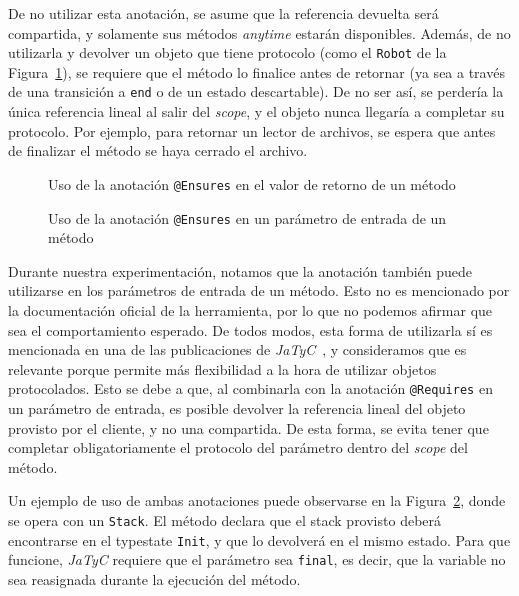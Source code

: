 De no utilizar esta anotación, se asume que la referencia devuelta será compartida, y solamente sus métodos \textit{anytime} estarán disponibles. Además, de no utilizarla y devolver un objeto que tiene protocolo (como el \texttt{Robot} de la Figura~\ref{jatyc:ensures}), se requiere que el método lo finalice antes de retornar (ya sea a través de una transición a \texttt{end} o de un estado descartable). De no ser así, se perdería la única referencia lineal al salir del \textit{scope}, y el objeto nunca llegaría a completar su protocolo. Por ejemplo, para retornar un lector de archivos, se espera que antes de finalizar el método se haya cerrado el archivo.

\begin{figure}[htbp]
    \centering
    
    \caption{Uso de la anotación \texttt{@Ensures} en el valor de retorno de un método}
    \label{jatyc:ensures}
\end{figure}

\begin{figure}[htbp]
    \centering
    
    \caption{Uso de la anotación \texttt{@Ensures} en un parámetro de entrada de un método}
    \label{jatyc:ensures_param}
\end{figure}

Durante nuestra experimentación, notamos que la anotación también puede utilizarse en los parámetros de entrada de un método. Esto no es mencionado por la documentación oficial de la herramienta, por lo que no podemos afirmar que sea el comportamiento esperado. De todos modos, esta forma de utilizarla sí es mencionada en una de las publicaciones de \textit{JaTyC}~\cite{jatyc:msc-thesis}, y consideramos que es relevante porque permite más flexibilidad a la hora de utilizar objetos protocolados. Esto se debe a que, al combinarla con la anotación \texttt{@Requires} en un parámetro de entrada, es posible devolver la referencia lineal del objeto provisto por el cliente, y no una compartida. De esta forma, se evita tener que completar obligatoriamente el protocolo del parámetro dentro del \textit{scope} del método.

Un ejemplo de uso de ambas anotaciones puede observarse en la Figura~\ref{jatyc:ensures_param}, donde se opera con un \texttt{Stack}. El método declara que el stack provisto deberá encontrarse en el typestate \texttt{Init}, y que lo devolverá en el mismo estado. Para que funcione, \textit{JaTyC} requiere que el parámetro sea \texttt{final}, es decir, que la variable no sea reasignada durante la ejecución del método.

